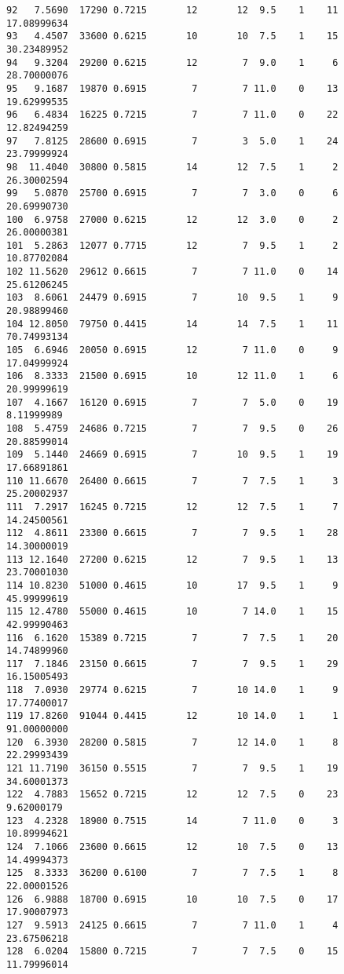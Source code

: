 \documentclass[
  letterpaper,
  DIV=11,
  numbers=noendperiod]{scrreprt}
\begin{document}
\begin{verbatim}
92   7.5690  17290 0.7215       12       12  9.5    1    11 17.08999634
93   4.4507  33600 0.6215       10       10  7.5    1    15 30.23489952
94   9.3204  29200 0.6215       12        7  9.0    1     6 28.70000076
95   9.1687  19870 0.6915        7        7 11.0    0    13 19.62999535
96   6.4834  16225 0.7215        7        7 11.0    0    22 12.82494259
97   7.8125  28600 0.6915        7        3  5.0    1    24 23.79999924
98  11.4040  30800 0.5815       14       12  7.5    1     2 26.30002594
99   5.0870  25700 0.6915        7        7  3.0    0     6 20.69990730
100  6.9758  27000 0.6215       12       12  3.0    0     2 26.00000381
101  5.2863  12077 0.7715       12        7  9.5    1     2 10.87702084
102 11.5620  29612 0.6615        7        7 11.0    0    14 25.61206245
103  8.6061  24479 0.6915        7       10  9.5    1     9 20.98899460
104 12.8050  79750 0.4415       14       14  7.5    1    11 70.74993134
105  6.6946  20050 0.6915       12        7 11.0    0     9 17.04999924
106  8.3333  21500 0.6915       10       12 11.0    1     6 20.99999619
107  4.1667  16120 0.6915        7        7  5.0    0    19  8.11999989
108  5.4759  24686 0.7215        7        7  9.5    0    26 20.88599014
109  5.1440  24669 0.6915        7       10  9.5    1    19 17.66891861
110 11.6670  26400 0.6615        7        7  7.5    1     3 25.20002937
111  7.2917  16245 0.7215       12       12  7.5    1     7 14.24500561
112  4.8611  23300 0.6615        7        7  9.5    1    28 14.30000019
113 12.1640  27200 0.6215       12        7  9.5    1    13 23.70001030
114 10.8230  51000 0.4615       10       17  9.5    1     9 45.99999619
115 12.4780  55000 0.4615       10        7 14.0    1    15 42.99990463
116  6.1620  15389 0.7215        7        7  7.5    1    20 14.74899960
117  7.1846  23150 0.6615        7        7  9.5    1    29 16.15005493
118  7.0930  29774 0.6215        7       10 14.0    1     9 17.77400017
119 17.8260  91044 0.4415       12       10 14.0    1     1 91.00000000
120  6.3930  28200 0.5815        7       12 14.0    1     8 22.29993439
121 11.7190  36150 0.5515        7        7  9.5    1    19 34.60001373
122  4.7883  15652 0.7215       12       12  7.5    0    23  9.62000179
123  4.2328  18900 0.7515       14        7 11.0    0     3 10.89994621
124  7.1066  23600 0.6615       12       10  7.5    0    13 14.49994373
125  8.3333  36200 0.6100        7        7  7.5    1     8 22.00001526
126  6.9888  18700 0.6915       10       10  7.5    0    17 17.90007973
127  9.5913  24125 0.6615        7        7 11.0    1     4 23.67506218
128  6.0204  15800 0.7215        7        7  7.5    0    15 11.79996014

\end{verbatim}
\end{document}
